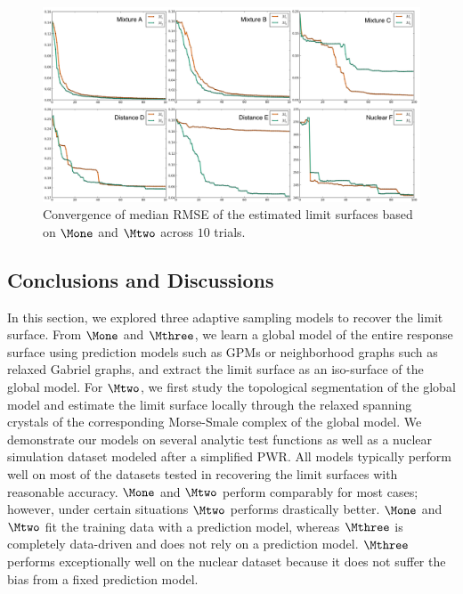 \clearpage

\begin{figure}[t]
\centering
\includegraphics[width=1.0\textwidth]{figs/chap5/RMSE-median.pdf}
\caption{Convergence of median RMSE of the estimated limit surfaces based on $\protect\Mone$ and $\protect\Mtwo$ across $10$ trials.}
\label{fig:RMSE-median}
\end{figure}

\subsection{Conclusions and Discussions}
\label{sec:discussion}

In this section, we explored three adaptive sampling models to recover the limit surface.
%
From $\Mone$ and $\Mthree$,  we learn a global model of the entire response surface using prediction models such as GPMs or neighborhood graphs such as relaxed Gabriel graphs, and extract the limit surface as an iso-surface of the global model.
%
For $\Mtwo$, we first study the topological segmentation of the global model and estimate the limit surface locally through the relaxed spanning crystals of the corresponding Morse-Smale complex of the global model.
%
We demonstrate our models on several analytic test functions as well as a nuclear simulation dataset modeled after a simplified PWR.
%
All models typically perform well on most of the datasets tested in recovering the limit surfaces with reasonable accuracy.
%
$\Mone$ and $\Mtwo$ perform comparably for most cases; however, under certain situations $\Mtwo$ performs drastically better.
%
$\Mone$ and $\Mtwo$ fit the training data with a prediction model, whereas $\Mthree$ is completely data-driven and does not rely on a prediction model.
%
$\Mthree$ performs exceptionally well on the nuclear dataset because it does not suffer the bias from a fixed prediction model.

